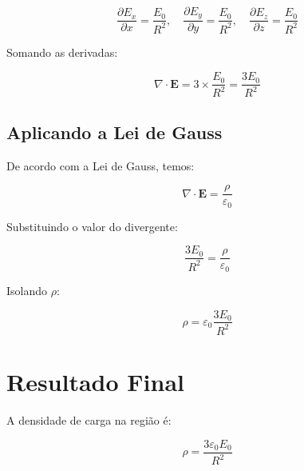\documentclass[a4paper,12pt]{article}
\begin{document}
\begin{flushleft}
\begin{equation}
\frac{\partial E_x}{\partial x} = \frac{E_0}{R^2}, \quad \frac{\partial E_y}{\partial y} = \frac{E_0}{R^2}, \quad \frac{\partial E_z}{\partial z} = \frac{E_0}{R^2}
\end{equation}

Somando as derivadas:

\begin{equation}
\nabla \cdot \mathbf{E} = 3 \times \frac{E_0}{R^2} = \frac{3 E_0}{R^2}
\end{equation}

\subsection*{Aplicando a Lei de Gauss}

De acordo com a Lei de Gauss, temos:

\begin{equation}
\nabla \cdot \mathbf{E} = \frac{\rho}{\varepsilon_0}
\end{equation}

Substituindo o valor do divergente:

\begin{equation}
\frac{3 E_0}{R^2} = \frac{\rho}{\varepsilon_0}
\end{equation}

Isolando \( \rho \):

\begin{equation}
\rho = \varepsilon_0 \frac{3 E_0}{R^2}
\end{equation}

\section*{Resultado Final}

A densidade de carga na região é:

\begin{equation}
\boxed{\rho = \frac{3 \varepsilon_0 E_0}{R^2}}
\end{equation}

\end{flushleft}
\end{document}

